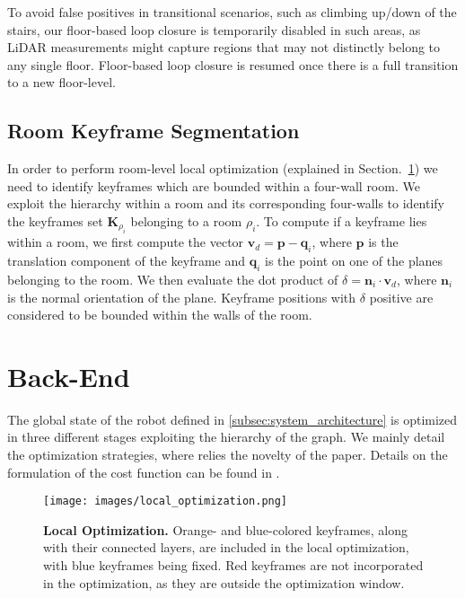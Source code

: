 To avoid false positives in transitional scenarios, such as climbing up/down of the stairs, our floor-based loop closure is temporarily disabled in such areas, as LiDAR measurements might capture regions that may not distinctly belong to any single floor. Floor-based loop closure is resumed once there is a full transition to a new floor-level. 

\subsection{Room Keyframe Segmentation} \label{sec:room_keyframe_segmentation}
In order to perform room-level local optimization (explained in Section.~\ref{sec:back_end}) we need to identify keyframes which are bounded within a four-wall room. We exploit the hierarchy within a room and its corresponding four-walls to identify the keyframes set $\boldsymbol{K}_{\rho_{i}}$ belonging to a room $\rho_i$. To compute if a keyframe lies within a room, we first compute the vector $\boldsymbol{v}_d = \boldsymbol{p} - \boldsymbol{q}_i$, where $\boldsymbol{p}$ is the translation component of the keyframe and $\boldsymbol{q}_i$ is the point on one of the planes belonging to the room. We then evaluate the dot product of $\delta = \boldsymbol{n}_i \cdot \boldsymbol{v}_d$, where $\boldsymbol{n}_i$ is the normal orientation of the plane. Keyframe positions with $\delta$ positive are considered to be bounded within the walls of the room. 

\section{Back-End} \label{sec:back_end}

The global state of the robot defined in \ref{subsec:system_architecture} is optimized in three different stages exploiting the hierarchy of the graph. We mainly detail the optimization strategies, where relies the novelty of the paper. Details on the formulation of the cost function can be found in \cite{s_graphs+}.

\begin{figure}[b]
  \centering
  \texttt{[image: images/local\_optimization.png]}
  \caption{\textbf{Local Optimization.} Orange- and blue-colored keyframes, along with their connected layers, are included in the local optimization, with blue keyframes being fixed. Red keyframes are not incorporated in the optimization, as they are outside the optimization window.}
  \label{fig:local_optimization}
\end{figure}


